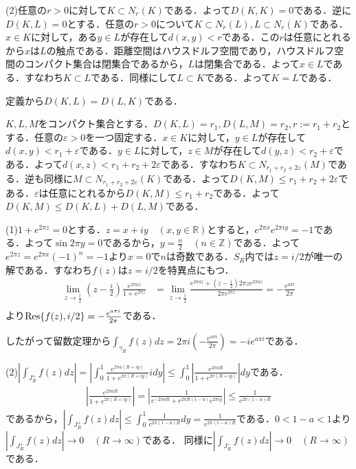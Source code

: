 \documentclass[
		book,
		head_space=20mm,
		foot_space=20mm,
		gutter=10mm,
		line_length=190mm
]{jlreq}
\begin{document}
(2)任意の$r>0$に対して$K\subset N_r(K)$である．よって$D(K,K)=0$である．逆に$D(K,L)=0$とする．任意の$r>0$について$K\subset N_r(L),L\subset N_r(K)$である．$x \in K$に対して，ある$y \in L$が存在して$d(x,y)<r$である．この$r$は任意にとれるから$x$は$L$の触点である．距離空間はハウスドルフ空間であり，ハウスドルフ空間のコンパクト集合は閉集合であるから，$L$は閉集合である．よって$x \in L$である．すなわち$K\subset L$である．同様にして$L\subset K$である．よって$K=L$である．

定義から$D(K,L)=D(L,K)$である．

$K,L,M$をコンパクト集合とする．$D(K,L)=r_1,D(L,M)=r_2,r:=r_1+r_2$とする．任意の$\varepsilon>0$を一つ固定する．$x \in K$に対して，$y \in L$が存在して$d(x,y)<r_1+\varepsilon$である．$y \in L$に対して，$z \in M$が存在して$d(y,z)<r_2+\varepsilon$である．よって$d(x,z)<r_1+r_2+2\varepsilon$である．すなわち$K\subset N_{r_1+r_2+2\varepsilon}(M)$である．逆も同様に$M \subset N_{r_1+r_2+2\varepsilon}(K)$である．よって$D(K,M)\le r_1+r_2+2\varepsilon$である．$\varepsilon$は任意にとれるから$D(K,M)\le r_1+r_2$である．よって$D(K,M)\le D(K,L)+D(L,M)$である．

(1)$1+e^{2\pi z}=0$とする．$z=x+iy \quad(x,y\in \mathbb{R})$とすると，$e^{2\pi x}e^{2\pi iy}=-1$である．よって$\sin 2\pi y=0$であるから，$y=\frac{n}{2}\quad (n \in \mathbb{Z})$である．よって$e^{2\pi z}=e^{2\pi x}(-1)^n=-1$より$x=0$で$n$は奇数である．$S_R$内では$z=i/2$が唯一の解である．すなわち$f(z)$は$z=i/2$を特異点にもつ．
\begin{align}
	\lim_{z\to \frac{i}{2}}(z-\frac{i}{2})\frac{e^{2\pi a z}}{1+e^{2\pi z}}&=\lim_{z\to \frac{i}{2}}\frac{e^{2\pi a z}+(z-\frac{i}{2})2\pi ze^{2\pi az}}{2\pi e^{2\pi z}}=-\frac{e^{a \pi i}}{2\pi}\\
\end{align}
より$\Res{f(z),i/2}=-\frac{e^{a \pi i}}{2\pi}$である．

したがって留数定理から$\int_{\gamma_R}f(z)dz=2\pi i(-\frac{e^{a \pi i}}{2\pi})=-i e^{a \pi i}$である．

(2)$|\int_{J_R^+}f(z)dz|=|\int_0^{1} \frac{e^{2\pi a (R+iy)}}{1+e^{2\pi (R+iy)}}idy|\le \int_0^{1}|\frac{e^{2\pi a R}}{1+e^{2\pi (R+iy)}}|dy$である．
\begin{align}
	\left|\frac{e^{2\pi a R}}{1+e^{2\pi (R+iy)}}\right|= \left| \frac{1}{e^{-2\pi aR}+e^{2\pi R(1-a)}e^{2\pi iy}}\right|\le \frac{1}{e^{2\pi(1-a)R}}
\end{align}であるから，$|\int_{J_R^+}f(z)dz|\le \int_0^{1}\frac{1}{e^{2\pi(1-a)R}}dy =\frac{1}{e^{2\pi(1-a)R}}$である．$0<1-a<1$より$|\int_{J_R^+}f(z)dz|\to 0\quad (R\to \infty)$である．
同様に$|\int_{J_R^-}f(z)dz|\to 0\quad (R\to \infty)$である．
\end{document}
